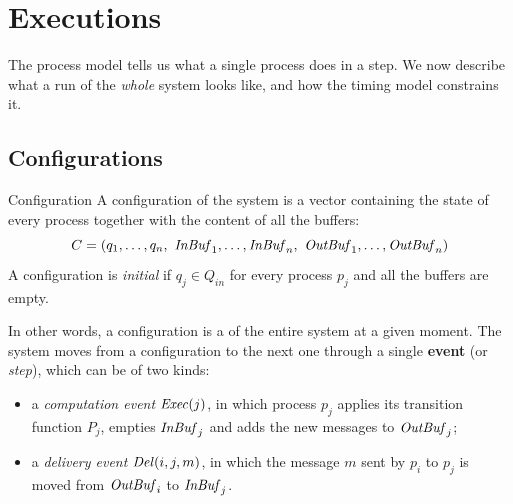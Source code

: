 \section{Executions}

The process model tells us what a single process does in a step. We now describe what a run of the \textit{whole} system looks like, and how the timing model constrains it.

\subsection{Configurations}

\begin{frameddefn}{Configuration}
  A configuration of the system is a vector containing the state of every process together with the content of all the buffers:
  \[C = \rbk{q_1, \ldots, q_n,\ \InBuf_1, \ldots, \InBuf_n,\ \OutBuf_1, \ldots, \OutBuf_n}\]
  A configuration is \textit{initial} if $q_j \in Q_{in}$ for every process $p_j$ and all the buffers are empty.
\end{frameddefn}

In other words, a configuration is a  of the entire system at a given moment. The system moves from a configuration to the next one through a single \textbf{event} (or \textit{step}), which can be of two kinds:
\begin{itemize}
  \item a \textit{computation event} $\mathit{Exec}(j)$, in which process $p_j$ applies its transition function $P_j$, empties $\mathit{InBuf}_j$ and adds the new messages to $\mathit{OutBuf}_j$;
  \item a \textit{delivery event} $\mathit{Del}(i,j,m)$, in which the message $m$ sent by $p_i$ to $p_j$ is moved from $\mathit{OutBuf}_i$ to $\mathit{InBuf}_j$.
\end{itemize}

